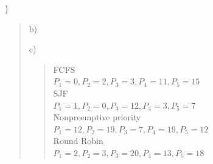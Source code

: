 \documentclass[11pt]{article}
\newenvironment{subquestion}[1]{#1) \begin{quote}}{\end{quote}}
\begin{document}
\begin{subquestion}{6.16}
\begin{subquestion}{b}
    \end{subquestion}
    \begin{subquestion}{c}
      \begin{center}
        FCFS\\
        $P_1 = 0, P_2 = 2, P_3 = 3, P_4 = 11, P_5 = 15$\\
        SJF\\
        $P_1 = 1, P_2 = 0, P_3 = 12, P_4 = 3, P_5 = 7$\\
        Nonpreemptive priority\\
        $P_1 = 12, P_2 = 19, P_3 = 7, P_4 = 19, P_5 = 12$\\
        Round Robin\\
        $P_1 = 2, P_2 = 3, P_3 = 20, P_4 = 13, P_5 = 18$\\
      \end{center}
    \end{subquestion}
  \end{subquestion}
\end{document}
